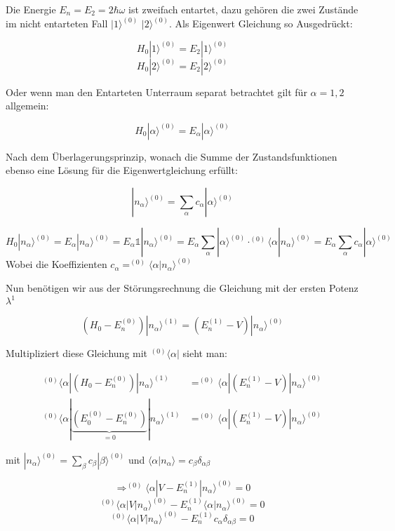 Die Energie \(E_n = E_2 = 2\hbar\omega\) ist zweifach entartet, dazu gehören die zwei Zustände im nicht entarteten Fall \(|1\rangle^{(0)} \)  \(|2\rangle^{(0)} \). Als Eigenwert Gleichung so Ausgedrückt:

\[H_0 |1\rangle^{(0)} = E_2 |1\rangle^{(0)} \]
\[H_0 |2\rangle^{(0)} = E_2 |2\rangle^{(0)} \]

Oder wenn man den Entarteten Unterraum separat betrachtet gilt für \(\alpha=1,2\) allgemein:

\[H_0 |\alpha\rangle^{(0)} = E_\alpha |\alpha\rangle^{(0)} \]

Nach dem Überlagerungsprinzip, wonach die Summe der Zustandsfunktionen ebenso eine Lösung für die Eigenwertgleichung erfüllt:

\[|n_\alpha\rangle^{(0)} = \sum_\alpha c_\alpha |\alpha\rangle ^{(0)}\]

\[H_0 |n_\alpha \rangle^{(0)} = E_\alpha |n_\alpha\rangle^{(0)} = E_\alpha \mathbb 1 |n_\alpha\rangle^{(0)} =  E_\alpha \sum_\alpha |\alpha\rangle^{(0)} \cdot^{(0)}\langle \alpha |n_\alpha\rangle^{(0)} = E_\alpha \sum_\alpha c_\alpha|\alpha\rangle ^{(0)} \]
Wobei die Koeffizienten \(c_\alpha =  ^{(0)} \langle \alpha |n_\alpha\rangle^{(0)}\)

Nun benötigen wir aus der Störungsrechnung die Gleichung mit der ersten Potenz \(\lambda^1\)

\[(H_0-E_n^{(0)})|n_\alpha\rangle ^{(1)} = (E_n^{(1)}-V)|n_\alpha\rangle^{(0)}\]

Multipliziert diese Gleichung mit \(^{(0)}\langle \alpha|\) sieht man:

\begin{align}
^{(0)}\langle \alpha|(H_0-E_n^{(0)})|n_\alpha\rangle ^{(1)} &= ^{(0)}\langle \alpha|(E_n^{(1)}-V)|n_\alpha\rangle^{(0)}\\
^{(0)}\langle \alpha|\underbrace{(E_0^{(0)}-E_n^{(0)})}_{=0}|n_\alpha\rangle ^{(1)} &=^{(0)}\langle \alpha| (E_n^{(1)}-V)|n_\alpha\rangle^{(0)}
\end{align}

mit \(|n_\alpha\rangle^{(0)} = \sum_\beta c_\beta |\beta\rangle ^{(0)} \) und \(\langle \alpha|n_\alpha\rangle = c_\beta\delta_{\alpha\beta}\)

\[\Rightarrow  ^{(0)} \langle \alpha|V-E_n^{(1)}|n_\alpha\rangle^{(0)} = 0 \]
\[  ^{(0)} \langle \alpha|V|n_\alpha\rangle^{(0)} -E_n^{(1)} \langle \alpha|n_\alpha\rangle^{(0)}  = 0 \]
\[  ^{(0)} \langle \alpha|V|n_\alpha\rangle^{(0)} -E_n^{(1)} c_\alpha  \delta_{\alpha\beta}  = 0 \]


